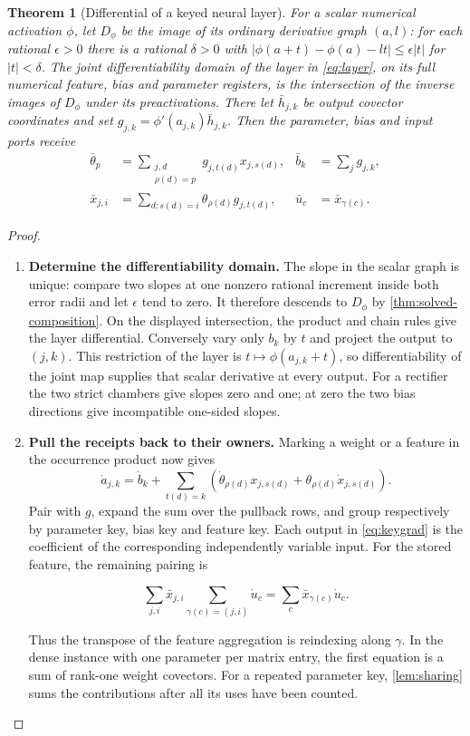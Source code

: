 \documentclass[11pt,a4paper]{article}
\newtheorem{theorem}{Theorem}[section]
\theoremstyle{definition}
\theoremstyle{remark}\newaliascnt{remark}{theorem}
\numberwithin{equation}{section}
\begin{document}
\begin{theorem}[Differential of a keyed neural layer]\label{thm:layer-back}
For a scalar numerical activation $\phi$, let $D_\phi$ be the image of its ordinary derivative graph $(a,l)$: for each rational $\epsilon>0$ there is a rational $\delta>0$ with $|\phi(a+t)-\phi(a)-lt|\le\epsilon |t|$ for $|t|<\delta$. The joint differentiability domain of the layer in \cref{eq:layer}, on its full numerical feature, bias and parameter registers, is the intersection of the inverse images of $D_\phi$ under its preactivations. There let \(\bar h_{j,k}\) be output covector coordinates and set \(g_{j,k}=\phi'(a_{j,k})\bar h_{j,k}\). Then the parameter, bias and input ports receive
\begin{align}
 \bar\theta_p&=\sum_{\substack{j,d\\\rho(d)=p}} g_{j,t(d)}x_{j,s(d)},&
 \bar b_k&=\sum_j g_{j,k},\label{eq:keygrad}\\
 \bar x_{j,i}&=\sum_{d:s(d)=i}\theta_{\rho(d)}g_{j,t(d)},& \bar u_c&=\bar x_{\gamma(c)}.
\end{align}
\end{theorem}
\begin{proof}\leavevmode
\begin{enumerate}[titledsteps]
    \item \textbf{Determine the differentiability domain.} The slope in the scalar graph is unique: compare two slopes at one nonzero rational increment inside both error radii and let $\epsilon$ tend to zero. It therefore descends to $D_\phi$ by \cref{thm:solved-composition}. On the displayed intersection, the product and chain rules give the layer differential. Conversely vary only $b_k$ by $t$ and project the output to $(j,k)$. This restriction of the layer is $t\mapsto\phi(a_{j,k}+t)$, so differentiability of the joint map supplies that scalar derivative at every output. For a rectifier the two strict chambers give slopes zero and one; at zero the two bias directions give incompatible one-sided slopes. 
    \item \textbf{Pull the receipts back to their owners.} Marking a weight or a feature in the occurrence product now gives
\[
 \dot a_{j,k}=\dot b_k+
 \sum_{t(d)=k}(\dot\theta_{\rho(d)}x_{j,s(d)}+
                        \theta_{\rho(d)}\dot x_{j,s(d)}).
\]
Pair with \(g\), expand the sum over the pullback rows, and group respectively by parameter key, bias key and feature key. Each output in \cref{eq:keygrad} is the coefficient of the corresponding independently variable input. For the stored feature, the remaining pairing is

\[
 \sum_{j,i}\bar x_{j,i}\sum_{\gamma(c)=(j,i)}\dot u_c
=\sum_c\bar x_{\gamma(c)}\dot u_c.
\]

Thus the transpose of the feature aggregation is reindexing along $\gamma$. In the dense instance with one parameter per matrix entry, the first equation is a sum of rank-one weight covectors. For a repeated parameter key, \cref{lem:sharing} sums the contributions after all its uses have been counted.\qedhere
\end{enumerate}
\end{proof}
\end{document}
